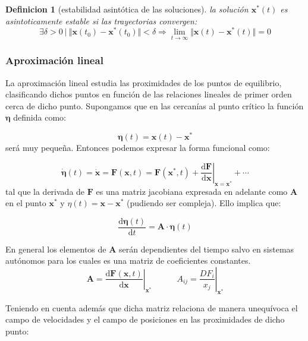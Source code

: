 \documentclass[12pt,a4paper]{article}
\numberwithin{equation}{section}
\numberwithin{figure}{section}
\newcommand{\D}{\mathrm{d}}
\newcommand{\derivadas}[2]{\frac{\D #1}{\D #2}}
\newcommand{\tquad}{\quad \quad \quad}
\newcommand{\xn}{\mathbf{x}}
\newcommand{\Fn}{\mathbf{F}}
\newcommand{\An}{\mathbf{A}}
\newcommand{\neta}{\boldsymbol{\eta}}
\newtheorem{definition}{Definicion}[section]
\begin{document}
\begin{definition}[estabilidad asintótica de las soluciones]
la solución $\xn^* (t)$ es asintoticamente estable si las trayectorias convergen:
\begin{equation}
\exists \delta > 0 \ | \ \Vert \xn(t_0) - \xn^* (t_0) \Vert < \delta \Longrightarrow \lim_{t \rightarrow \infty} \Vert \xn(t)  - \xn^* (t) \Vert = 0
\end{equation}
\end{definition}


\subsubsection{Aproximación lineal}

La aproximación lineal estudia las proximidades de los puntos de equilibrio, clasificando dichos puntos en función de las relaciones lineales de primer orden cerca de dicho punto. Supongamos que en las cercanías al punto crítico la función $\neta$ definida como:

\begin{equation}
\neta (t) = \xn (t) - \xn^*
\end{equation}
será muy pequeña. Entonces podemos expresar la forma funcional como:

\begin{equation}
\dot{\neta}(t) = \dot{\xn} = \Fn (\xn,t) = \Fn (\xn^*,t) + \left. \derivadas{\Fn}{\xn} \right|_{\xn = \xn ^*} + \cdots
\end{equation} 
tal que la derivada de $\Fn$ es una matriz jacobiana expresada en adelante como $\An$  en el punto $\xn^*$ y $\eta(t)=\xn-\xn^*$ (pudiendo ser compleja). Ello implica que:

\begin{equation}
\derivadas{\neta (t)}{t} = \An \cdot \neta (t)
\end{equation}

 En general los elementos de $\An$ serán dependientes del tiempo salvo en sistemas autónomos para los cuales es una matriz de coeficientes constantes. \\

\begin{equation}
\An = \left. \dfrac{\D \Fn(\xn,t)}{\D \xn} \right|_{\xn^*} \tquad A_{ij} = \left. \dfrac{D F_i}{x_j} \right|_{\xn^*}
\end{equation}

Teniendo en cuenta además que dicha matriz relaciona de manera unequívoca el campo de velocidades y el campo de posiciones en las proximidades de dicho punto:
\end{document}
